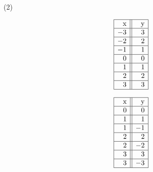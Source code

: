 \begin{tasks}[resume](2)

\task  \label{tablefirst} 
\begin{minipage}[t]{0.5\textwidth}

\[\begin{array}{|r||r|}  \hline

$x$  & \hphantom{\text{$-$}} $y$  \\ \hline
 -3 &  3 \\  \hline
 -2 & 2  \\  \hline
  -1 &  1  \\  \hline
 0 &  0 \\  \hline
 1 & 1  \\  \hline
 2 &  2 \\  \hline
 3 & 3  \\  \hline

\end{array}\]

\end{minipage}

\task \label{tablelast}
\begin{minipage}[t]{0.5\textwidth}
      
\[\begin{array}{|r||r|}  \hline

\hphantom{\text{$-$}} $x$  &$y$  \\ \hline

 0 & 0 \\  \hline
 1 & 1  \\  \hline
 1 & -1  \\  \hline
 2 &  2 \\  \hline
 2 & -2  \\  \hline
 3 &  3 \\  \hline
 3 & -3  \\  \hline

\end{array}\]

\end{minipage}

\end{tasks}

